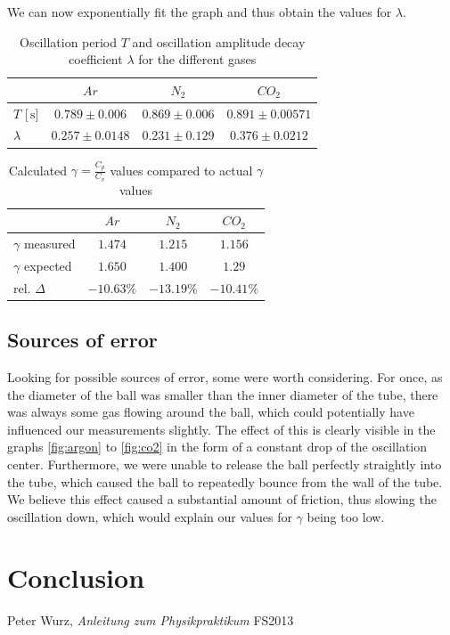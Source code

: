 \documentclass{scrreprt}
\newcommand{\unit}[1]{\ensuremath{\, \mathrm{#1}}}
\begin{document}
We can now exponentially fit the graph and thus obtain the values for $\lambda$.

\begin{table}[H]
\center
\begin{tabular}{|l|ccc|}
\hline
	&	$Ar$ & $N_2$		&	$CO_2$\\ \hline\hline
$T$ [$\unit{s}$] & $0.789 \pm 0.006$ & $0.869 \pm 0.006$  & $0.891 \pm 0.00571$\\\hline
$\lambda$ & $0.257 \pm 0.0148$ & $0.231 \pm 0.129$ & $0.376 \pm 0.0212$\\ \hline

\end{tabular}
\caption{Oscillation period $T$ and oscillation amplitude decay coefficient $\lambda$ for the different gases}
\end{table}

\begin{table}[H]
\center
\begin{tabular}{|l|ccc|}
\hline
	&	$Ar$ & $N_2$		&	$CO_2$\\ \hline\hline
$\gamma$ measured & $1.474$ & $1.215$  & $1.156$\\\hline
$\gamma$ expected & $1.650$ & $1.400$ & $1.29$\\ \hline
rel. $\Delta$ & $-10.63\%$ & $-13.19\%$ & $-10.41\%$\\ \hline

\end{tabular}
\caption{Calculated $\gamma = \frac{C_p}{C_v}$ values compared to actual $\gamma$ values }
\end{table}

\subsection{Sources of error}
\label{sec:error}
Looking for possible sources of error, some were worth considering. For once, as the diameter of the ball was smaller than the inner diameter of the tube, there was always some gas flowing around the ball, which could potentially have influenced our measurements slightly. The effect of this is clearly visible in the graphs \ref{fig:argon} to \ref{fig:co2} in the form of a constant drop of the oscillation center. Furthermore, we were unable to release the ball perfectly straightly into the tube, which caused the ball to repeatedly bounce from the wall of the tube. We believe this effect caused a substantial amount of friction, thus slowing the oscillation down, which would explain our values for $\gamma$ being too low.

\section{Conclusion}


\begin{thebibliography}{9}

  Peter Wurz,
  \emph{Anleitung zum Physikpraktikum}
  FS2013

\end{thebibliography}
\end{document}
